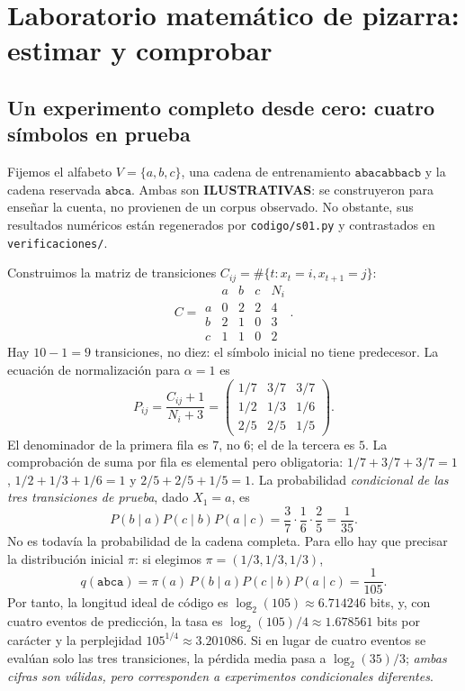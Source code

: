 \chapter*{Laboratorio matemático de pizarra: estimar y comprobar}

\section*{Un experimento completo desde cero: cuatro símbolos en prueba}
Fijemos el alfabeto $V=\{a,b,c\}$, una cadena de entrenamiento
$\texttt{abacabbacb}$ y la cadena reservada $\texttt{abca}$.
Ambas son \textbf{ILUSTRATIVAS}: se construyeron para enseñar la cuenta, no provienen de
un corpus observado. No obstante, sus resultados numéricos están regenerados por
\texttt{codigo/s01.py} y contrastados en \texttt{verificaciones/}.

Construimos la matriz de transiciones $C_{ij}=\#\{t:x_t=i,x_{t+1}=j\}$:
\[
C=\begin{array}{c|rrr|r}&a&b&c&N_i\\\hline
 a&0&2&2&4\\ b&2&1&0&3\\ c&1&1&0&2\end{array}.
\]
Hay $10-1=9$ transiciones, no diez: el símbolo inicial no tiene predecesor.
La ecuación de normalización para $\alpha=1$ es
\[
 P_{ij}=\frac{C_{ij}+1}{N_i+3}
 =\begin{pmatrix}1/7&3/7&3/7\\1/2&1/3&1/6\\2/5&2/5&1/5\end{pmatrix}.
\]
El denominador de la primera fila es $7$, no $6$; el de la tercera es $5$.
La comprobación de suma por fila es elemental pero obligatoria:
$1/7+3/7+3/7=1$, $1/2+1/3+1/6=1$ y $2/5+2/5+1/5=1$.
La probabilidad \emph{condicional de las tres transiciones de prueba}, dado $X_1=a$, es
\[
 P(b\mid a)P(c\mid b)P(a\mid c)
 =\frac37\cdot\frac16\cdot\frac25=\frac1{35}.
\]
No es todavía la probabilidad de la cadena completa. Para ello hay que precisar
la distribución inicial $\pi$: si elegimos $\pi=(1/3,1/3,1/3)$,
\[
 q(\texttt{abca})=\pi(a)\,P(b\mid a)P(c\mid b)P(a\mid c)=\frac1{105}.
\]
Por tanto, la longitud ideal de código es $\log_2(105)\approx6.714246$ bits,
y, con cuatro eventos de predicción, la tasa es
$\log_2(105)/4\approx1.678561$ bits por carácter y la perplejidad
$105^{1/4}\approx3.201086$.
Si en lugar de cuatro eventos se evalúan solo las tres transiciones,
la pérdida media pasa a $\log_2(35)/3$; \emph{ambas cifras son válidas,
pero corresponden a experimentos condicionales diferentes}.

